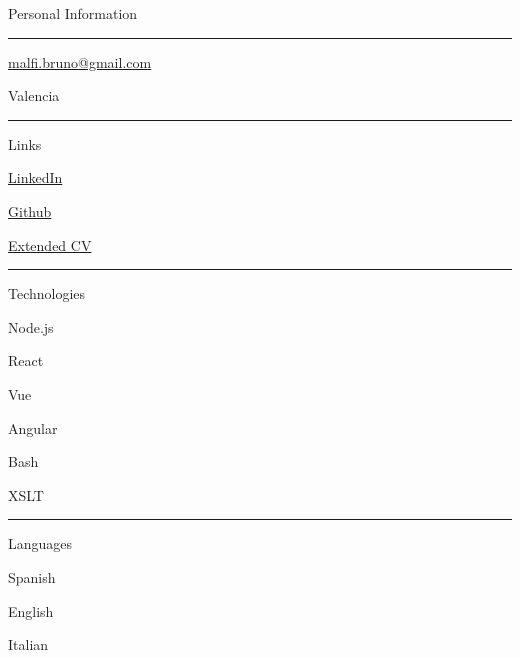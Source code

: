 \documentclass{letter}
\begin{document}
\begin{minipage}[t]{0.40\textwidth}
\setlength{\baselineskip}{1.5\baselineskip}
\color{white}
\vspace{1cm}
{\large Personal Information}

\rule{\linewidth}{0.4pt}

\faPhone \quad  

\faEnvelope \quad \href{malfi.bruno@gmail.com}{malfi.bruno@gmail.com}

\faMapMarker \quad Valencia

\rule{\linewidth}{0.4pt}

{\large Links}

\faLinkedin \quad \href{https://www.linkedin.com/in/bruno-malfi-fabeiro}{LinkedIn}

\faGithub \quad \href{https://github.com/BrunoMalfi}{Github}

\faPaperclip \quad \href{https://github.com/BrunoMalfi/CV/blob/main/CV_ES.md}{Extended CV}

\rule{\linewidth}{0.4pt}

{\large Technologies}

\faNodeJs \quad Node.js

\faReact \quad React

\faVuejs \quad Vue

\faAngular \quad Angular

\faLinux \quad Bash

\faCircleNotch \quad XSLT

\rule{\linewidth}{0.4pt}

{\large Languages}

\faLanguage \quad Spanish

\faLanguage \quad English

\faLanguage \quad Italian

\end{minipage}
\hfill
\end{document}
